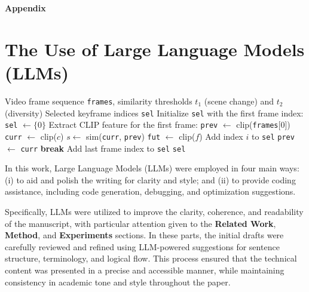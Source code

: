 \clearpage
\noindent
\begin{center}
    \Large \textbf{Appendix}
\end{center}
\vspace{-1em} %


\section{The Use of Large Language Models (LLMs)}

\begin{algorithm}[h]
\caption{Keyframe Extraction via Bidirectional CLIP Similarity}
\begin{algorithmic}[1]
\REQUIRE Video frame sequence \texttt{frames}, similarity thresholds $t_1$ (scene change) and $t_2$ (diversity)
\ENSURE Selected keyframe indices \texttt{sel}
\STATE Initialize \texttt{sel} with the first frame index: \texttt{sel} $\leftarrow \{0\}$
\STATE Extract CLIP feature for the first frame: \texttt{prev} $\leftarrow$ clip(\texttt{frames}[0])
    \STATE \texttt{curr} $\leftarrow$ clip($c$)
    \STATE $s \leftarrow$ sim(\texttt{curr}, \texttt{prev})
            \STATE \texttt{fut} $\leftarrow$ clip($f$)
                \STATE Add index $i$ to \texttt{sel}
                \STATE \texttt{prev} $\leftarrow$ \texttt{curr}
                \STATE \textbf{break}
            \ENDIF
        \ENDFOR
    \ENDIF
\ENDFOR
{}
    \STATE Add last frame index to \texttt{sel}
\ENDIF
\RETURN \texttt{sel}
\end{algorithmic}
\label{alg:keyframe_clip}
\end{algorithm}

In this work, Large Language Models (LLMs) were employed in four main ways: (i) to aid and polish the writing for clarity and style; and (ii) to provide coding assistance, including code generation, debugging, and optimization suggestions.

Specifically, LLMs were utilized to improve the clarity, coherence, and readability of the manuscript, with particular attention given to the \textbf{Related Work}, \textbf{Method}, and \textbf{Experiments} sections. In these parts, the initial drafts were carefully reviewed and refined using LLM-powered suggestions for sentence structure, terminology, and logical flow. This process ensured that the technical content was presented in a precise and accessible manner, while maintaining consistency in academic tone and style throughout the paper.

